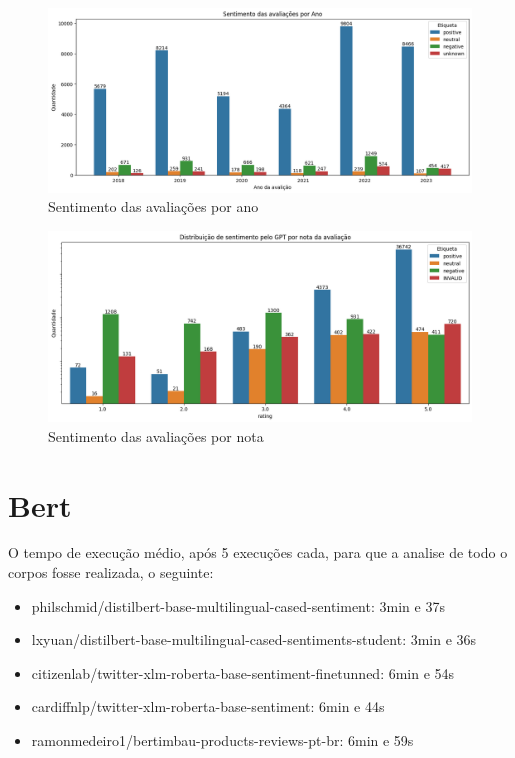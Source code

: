 \begin{figure}
	\centering
	\includegraphics[width=1\textwidth]{figs/gpt/sentimento_ano.png}
	\caption{Sentimento das avaliações por ano}
	\label{img:gpt_sentimento_ano}
\end{figure}

\begin{figure}
	\centering
	\includegraphics[width=1\textwidth]{figs/gpt/sentimento_nota.png}
	\caption{Sentimento das avaliações por nota}
	\label{img:gpt_sentimento_nota}
\end{figure}

\section[Bert]{Bert}
\label{sec:resultados:subsec:bert}

O tempo de execução médio, após 5 execuções cada, para que a analise de todo o corpos fosse realizada, o seguinte:

\begin{itemize}
	\item philschmid/distilbert-base-multilingual-cased-sentiment: 3min e 37s
	\item lxyuan/distilbert-base-multilingual-cased-sentiments-student: 3min e 36s
	\item citizenlab/twitter-xlm-roberta-base-sentiment-finetunned: 6min e 54s
	\item cardiffnlp/twitter-xlm-roberta-base-sentiment: 6min e 44s
	\item ramonmedeiro1/bertimbau-products-reviews-pt-br: 6min e 59s
\end{itemize}










